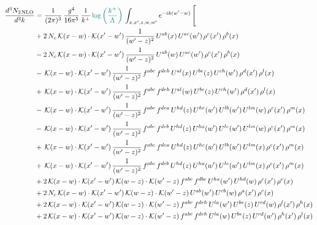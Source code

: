 \documentclass[9pt]{article}
\numberwithin{equation}{section}
\begin{document}
\begin{align}
\frac{d^{3}N_{2\,\mathrm{NLO}}}{d^{3}k} & = \frac{1}{(2\pi)^{3}}\,\frac{g^{4}}{16\pi^{5}}\,\frac{1}{k^{+}}\,{\color{teal}\log{\left(\frac{k^{+}}{\Lambda}\right)}}\,\int_{x,x',z,w,w'}e^{-ik(w'-w)}\,\Bigg[
\notag \\ &+2\,N_{c}\,\mathcal{K}(x-w)\cdot\mathcal{K}(x'-w')\,\frac{1}{(w'-z)^{2}}\,U^{ab}(x)\,U^{ac}(w')\,\rho^{c}(x')\,\rho^{b}(x)\notag\\
&-2\,N_{c}\,\mathcal{K}(x-w)\cdot\mathcal{K}(x'-w')\,\frac{1}{(w'-z)^{2}}\,U^{ab}(w)\,U^{ac}(w')\,\rho^{c}(x')\,\rho^{b}(x)\notag\\
&-\,\mathcal{K}(x-w)\cdot\mathcal{K}(x'-w')\,\frac{1}{(w'-z)^{2}}\,f^{abc}\,f^{deh}\,U^{al}(x)\,U^{be}(z)\,U^{ch}(w')\,\rho^{d}(x')\,\rho^{l}(x)\notag\\
&+\,\mathcal{K}(x-w)\cdot\mathcal{K}(x'-w')\,\frac{1}{(w'-z)^{2}}\,f^{abc}\,f^{deh}\,U^{al}(w)\,U^{be}(z)\,U^{ch}(w')\,\rho^{d}(x')\,\rho^{l}(x)\notag \\ & -\,\mathcal{K}(x-w)\cdot\mathcal{K}(x'-w')\,\frac{1}{(w'-z)^{2}}\,f^{abc}\,f^{dea}\,U^{hd}(z)\,U^{he}(w')\,U^{lb}(w')\,U^{lm}(w)\,\rho^{c}(x')\,\rho^{m}(x)\notag\\
&-\,\mathcal{K}(x-w)\cdot\mathcal{K}(x'-w')\,\frac{1}{(w'-z)^{2}}\,f^{abc}\,f^{deb}\,U^{hd}(z)\,U^{ha}(w')\,U^{le}(w')\,U^{lm}(w)\,\rho^{c}(x')\,\rho^{m}(x)\notag\\
&+\,\mathcal{K}(x-w)\cdot\mathcal{K}(x'-w')\,\frac{1}{(w'-z)^{2}}\,f^{abc}\,f^{dea}\,U^{hd}(z)\,U^{he}(w')\,U^{lb}(w')\,U^{lm}(x)\,\rho^{c}(x')\,\rho^{m}(x)\notag\\
&+\,\mathcal{K}(x-w)\cdot\mathcal{K}(x'-w')\,\frac{1}{(w'-z)^{2}}\,f^{abc}\,f^{deb}\,U^{hd}(z)\,U^{ha}(w')\,U^{le}(w')\,U^{lm}(x)\,\rho^{c}(x')\,\rho^{m}(x)\notag\\
&+2\,\mathcal{K}(x-w)\cdot\mathcal{K}(x'-w')\,\mathcal{K}(w-z)\cdot\mathcal{K}(w'-z)\,f^{abc}\,f^{dbe}\,U^{ha}(w')\,U^{hd}(w)\,\rho^{c}(x')\,\rho^{e}(x)\notag\\
&+2\,N_{c}\,\mathcal{K}(x-w)\cdot\mathcal{K}(x'-w')\,\mathcal{K}(w-z)\cdot\mathcal{K}(w'-z)\,U^{ab}(w')\,U^{cb}(w)\,\rho^{a}(x')\,\rho^{c}(x)\notag \\ & +2\,\mathcal{K}(x-w)\cdot\mathcal{K}(x'-w')\,\mathcal{K}(w-z)\cdot\mathcal{K}(w'-z)\,f^{abc}\,f^{deh}\,U^{la}(w')\,U^{be}(z)\,U^{cd}(w)\,\rho^{l}(x')\,\rho^{h}(x)\notag\\
&+2\,\mathcal{K}(x-w)\cdot\mathcal{K}(x'-w')\,\mathcal{K}(w-z)\cdot\mathcal{K}(w'-z)\,f^{abc}\,f^{deh}\,U^{la}(w)\,U^{be}(z)\,U^{cd}(w')\,\rho^{h}(x')\,\rho^{l}(x)\notag\\

\end{align}
\end{document}
